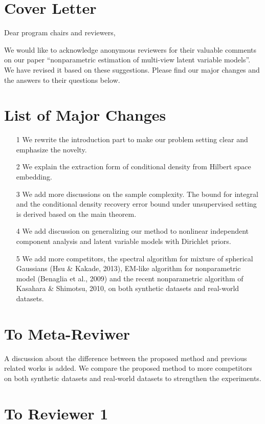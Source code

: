 \documentclass{article}
\begin{document}
\section*{Cover Letter}

Dear program chairs and reviewers,

We would like to acknowledge anonymous reviewers for their valuable comments on our paper ``nonparametric estimation of multi-view latent variable models''. We have revised it based on these suggestions. Please find our major changes and the answers to their questions below.


\section*{List of Major Changes}

\begin{itemize}
\item[1] We rewrite the introduction part to make our problem setting clear and emphasize the novelty.
\item[2] We explain the extraction form of conditional density from Hilbert space embedding.
\item[3] We add more discussions on the sample complexity. The bound for integral and the conditional density recovery error bound under unsupervised setting is derived based on the main theorem.
\item[4] We add discussion on generalizing our method to nonlinear independent component analysis and latent variable models with Dirichlet priors.
\item[5] We add more competitors, the spectral algorithm for mixture of spherical Gaussians (Hsu \& Kakade, 2013), EM-like algorithm for nonparametric model (Benaglia et al., 2009) and the recent nonparametric algorithm of Kasahara \& Shimotsu, 2010, on both synthetic datasets and real-world datasets.
\end{itemize}

\section*{To Meta-Reviwer}
A discussion about the difference between the proposed method and previous related works is added. We compare the proposed method to more competitors on both synthetic datasets and real-world datasets to strengthen the experiments.

\section*{To Reviewer 1}
\end{document}
